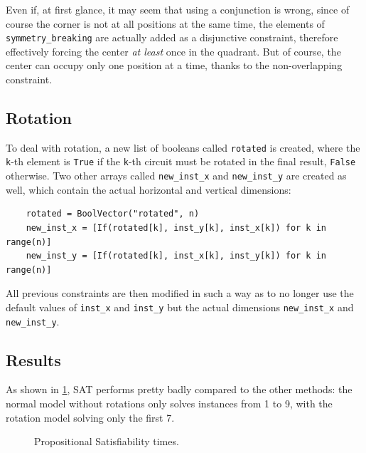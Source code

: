 \documentclass[a4paper, 12pt]{article}
\begin{document}
Even if, at first glance, it may seem that using a conjunction is wrong, since of course the corner is not at all positions at the same time, the elements of \verb|symmetry_breaking| are actually added as a disjunctive constraint, therefore effectively forcing the center \emph{at least} once in the quadrant. But of course, the center can occupy only one position at a time, thanks to the non-overlapping constraint.


\subsection{Rotation}

To deal with rotation, a new list of booleans called \verb|rotated| is created, where the \verb|k|-th element is \verb|True| if the \verb|k|-th circuit must be rotated in the final result, \verb|False| otherwise. Two other arrays called \verb|new_inst_x| and \verb|new_inst_y| are created as well, which contain the actual horizontal and vertical dimensions:
\begin{verbatim}
    rotated = BoolVector("rotated", n)
    new_inst_x = [If(rotated[k], inst_y[k], inst_x[k]) for k in range(n)]
    new_inst_y = [If(rotated[k], inst_x[k], inst_y[k]) for k in range(n)]
\end{verbatim}

All previous constraints are then modified in such a way as to no longer use the default values of \verb|inst_x| and \verb|inst_y| but the actual dimensions \verb|new_inst_x| and \verb|new_inst_y|.


\subsection{Results}

As shown in \cref{fig:sat}, SAT performs pretty badly compared to the other methods: the normal model without rotations only solves instances from 1 to 9, with the rotation model solving only the first 7.

\begin{figure}
    \centering
    \caption{Propositional Satisfiability times.}
    \label{fig:sat}
\end{figure}
\end{document}
